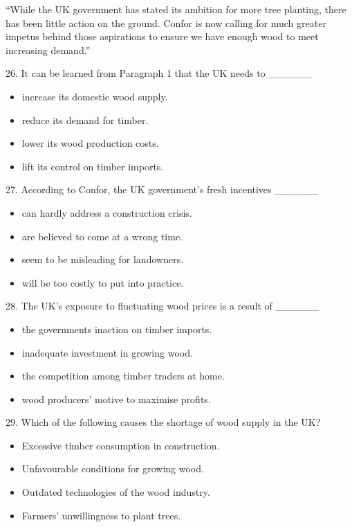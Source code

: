 \documentclass[UTF8,11pt]{ctexart}
\begin{document}
“While the UK government has stated its ambition for more tree planting, there has been little action on the ground. Confor is now calling for much greater impetus behind those aspirations to ensure we have enough wood to meet increasing demand.”


26. It can be learned from Paragraph 1 that the UK needs to \_\_\_\_\_\_


\begin{itemize}[leftmargin=2em,itemsep=.2em,topsep=.4em]\item[A.] increase its domestic wood supply.
\item[B.] reduce its demand for timber.
\item[C.] lower its wood production costs.
\item[D.] lift its control on timber imports.
\end{itemize}

27. According to Confor, the UK government’s fresh incentives \_\_\_\_\_\_


\begin{itemize}[leftmargin=2em,itemsep=.2em,topsep=.4em]\item[A.] can hardly address a construction crisis.
\item[B.] are believed to come at a wrong time.
\item[C.] seem to be misleading for landowners.
\item[D.] will be too costly to put into practice.
\end{itemize}

28. The UK’s exposure to fluctuating wood prices is a result of \_\_\_\_\_\_


\begin{itemize}[leftmargin=2em,itemsep=.2em,topsep=.4em]\item[A.] the governments inaction on timber imports.
\item[B.] inadequate investment in growing wood.
\item[C.] the competition among timber traders at home.
\item[D.] wood producers’ motive to maximise profits.
\end{itemize}

29. Which of the following causes the shortage of wood supply in the UK?


\begin{itemize}[leftmargin=2em,itemsep=.2em,topsep=.4em]\item[A.] Excessive timber consumption in construction.
\item[B.] Unfavourable conditions for growing wood.
\item[C.] Outdated technologies of the wood industry.
\item[D.] Farmers’ unwillingness to plant trees.
\end{itemize}
\end{document}

